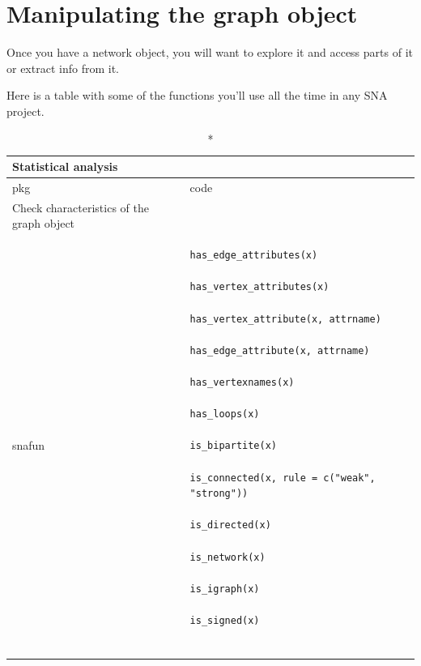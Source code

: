 \documentclass[
]{article}
\begin{document}
\hypertarget{manipulate}{%
\section{Manipulating the graph object}\label{manipulate}}

Once you have a network object, you will want to explore it and access
parts of it or extract info from it.

Here is a table with some of the functions you'll use all the time in
any SNA project.

\captionsetup[table]{labelformat=empty,skip=1pt}
\setlength{\LTpost}{0mm}
\begin{longtable}{ll}
\caption*{
{\large Statistical analysis}
} \\ 
\toprule
pkg & code \\ 
\midrule
\multicolumn{1}{l}{Check characteristics of the graph object} \\ 
\midrule
snafun & \begin{verbatim}
has_edge_attributes(x)

has_vertex_attributes(x)

has_vertex_attribute(x, attrname)

has_edge_attribute(x, attrname)

has_vertexnames(x)

has_loops(x)

is_bipartite(x)

is_connected(x, rule = c("weak", "strong"))

is_directed(x)

is_network(x)

is_igraph(x)

is_signed(x)


\end{verbatim}
\end{longtable}
\end{document}
